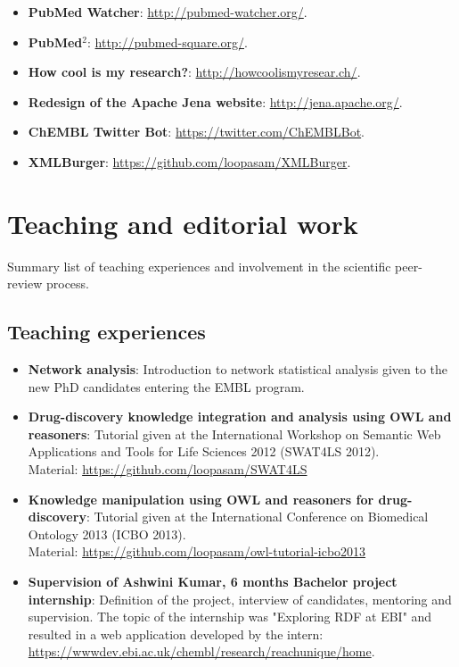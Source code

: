 \begin{itemize}
  \item \textbf{PubMed Watcher}: \url{http://pubmed-watcher.org/}.
  \item \textbf{PubMed$^{2}$}: \url{http://pubmed-square.org/}.
  \item \textbf{How cool is my research?}: \url{http://howcoolismyresear.ch/}.
  \item \textbf{Redesign of the Apache Jena website}: \url{http://jena.apache.org/}.
  \item \textbf{ChEMBL Twitter Bot}: \url{https://twitter.com/ChEMBLBot}.
  \item \textbf{XMLBurger}: \url{https://github.com/loopasam/XMLBurger}.
\end{itemize}

\chapter{Teaching and editorial work}
Summary list of teaching experiences and involvement in the scientific peer-review process.
\section{Teaching experiences}
\begin{itemize}
  \item \textbf{Network analysis}: Introduction to network statistical analysis given to the new PhD candidates entering the EMBL program. 
  \item \textbf{Drug-discovery knowledge integration and analysis using OWL and reasoners}: Tutorial given at the International Workshop on Semantic Web Applications and Tools for Life Sciences 2012 (SWAT4LS 2012). \\ Material: \url{https://github.com/loopasam/SWAT4LS}
  \item \textbf{Knowledge manipulation using OWL and reasoners for drug-discovery}: Tutorial given at the International Conference on Biomedical Ontology 2013 (ICBO 2013). \\ Material: \url{https://github.com/loopasam/owl-tutorial-icbo2013}
  \item \textbf{Supervision of Ashwini Kumar, 6 months Bachelor project internship}: Definition of the project, interview of candidates, mentoring and supervision. The topic of the internship was "Exploring RDF at EBI" and resulted in a web application developed by the intern: \url{https://wwwdev.ebi.ac.uk/chembl/research/reachunique/home}.
\end{itemize}

